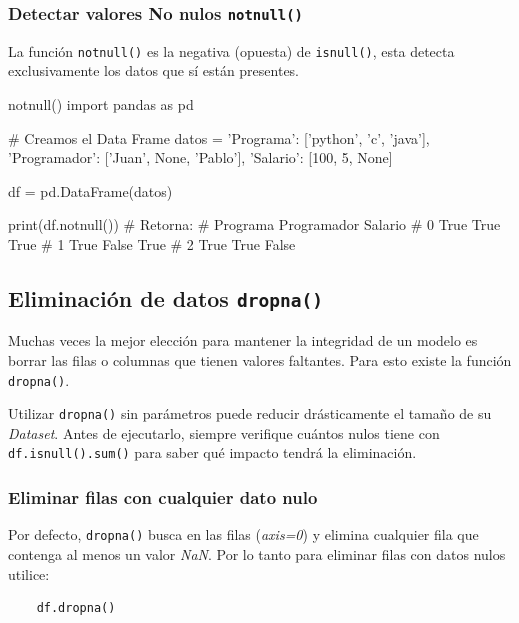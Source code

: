 \subsubsection{Detectar valores No nulos \texttt{notnull()}}

La función \texttt{notnull()} es la negativa (opuesta) de \texttt{isnull()}, esta detecta exclusivamente los datos que sí están presentes.

\begin{pycode}{notnull()}
import pandas as pd

# Creamos el Data Frame
datos = {
    'Programa': ['python', 'c', 'java'],
    'Programador': ['Juan', None, 'Pablo'],
    'Salario': [100, 5, None]
}    

df = pd.DataFrame(datos)

print(df.notnull()) # Retorna:
#    Programa  Programador  Salario
# 0      True         True     True
# 1      True        False     True
# 2      True         True    False
\end{pycode}




\subsection{Eliminación de datos \texttt{dropna()}}

Muchas veces la mejor elección para mantener la integridad de un modelo es borrar las filas o columnas que tienen valores faltantes. Para esto existe la función \texttt{dropna()}.
\begin{nota}
    Utilizar \texttt{dropna()} sin parámetros puede reducir drásticamente el tamaño de su \textit{Dataset}. Antes de ejecutarlo, siempre verifique cuántos nulos tiene con \texttt{df.isnull().sum()} para saber qué impacto tendrá la eliminación.
\end{nota}

\subsubsection{Eliminar filas con cualquier dato nulo}

Por defecto, \texttt{dropna()} busca en las filas (\textit{axis=0}) y elimina cualquier fila que contenga al menos un valor \textit{NaN}. Por lo tanto para eliminar filas con datos nulos utilice:
\begin{verbatim}
    df.dropna()
\end{verbatim}

